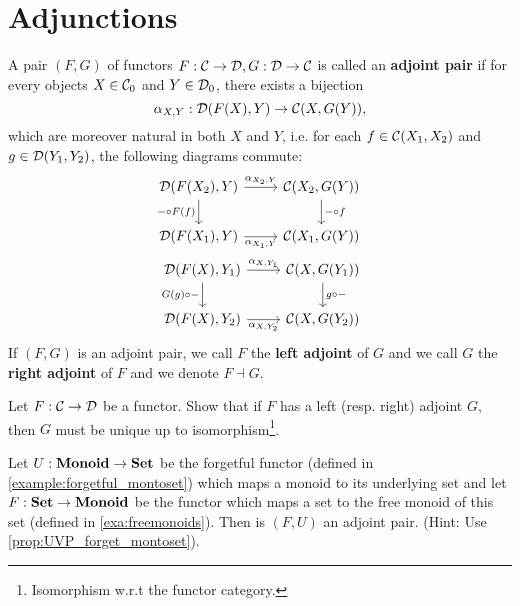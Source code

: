 \section{Adjunctions}
\label{sec:adjunctions}

\begin{dfn} A pair $(F,G)$ of functors $F : \mathcal{C}\to\mathcal{D}, G:\mathcal{D}\to\mathcal{C}$ is called an \textbf{adjoint pair} if for every objects $X\in{\mathcal{C}}_0$ and $Y\in{\mathcal{D}}_0$, there exists a bijection 
\[
\alpha_{X,Y} : {\mathcal{D}}(F(X),Y) \to {\mathcal{C}}(X,G(Y)),
\]
which are moreover natural in both $X$ and $Y$, i.e. for each $f\in{\mathcal{C}}(X_1,X_2)$ and $g\in{\mathcal{D}}(Y_1,Y_2)$, the following diagrams commute:
\begin{eqnarray}
\begin{tikzcd}
\CHom{\DD}{F(X_2)}{Y} \arrow[r, "\alpha_{X_2,Y}"] \arrow[d,swap, "\co{F(f)}{-}"] & \CHom{\CC}{X_2}{G(Y)} \arrow[d, "\co{f}{-}"] \\
\CHom{\DD}{F(X_1)}{Y} \arrow[r,swap, "\alpha_{X_1,Y}"] & \CHom{\CC}{X_1}{G(Y)}
\end{tikzcd}\\
\begin{tikzcd}
\CHom{\DD}{F(X)}{Y_1} \arrow[r, "\alpha_{X,Y_1}"] \arrow[d,swap, "\co{-}{G(g)}"] & \CHom{\CC}{X}{G(Y_1)} \arrow[d, "\co{-}{g}"] \\
\CHom{\DD}{F(X)}{Y_2} \arrow[r,swap, "\alpha_{X,Y_2}"] & \CHom{\CC}{X}{G(Y_2)}
\end{tikzcd}
\end{eqnarray}
If $(F,G)$ is an adjoint pair, we call $F$ the \textbf{left adjoint} of $G$ and we call $G$ the \textbf{right adjoint} of $F$ and we denote $F \dashv G$.
\end{dfn}

\begin{exer} Let $F:\mathcal{C}\to\mathcal{D}$ be a functor. Show that if $F$ has a left (resp. right) adjoint $G$, then $G$ must be unique up to isomorphism\footnote{Isomorphism w.r.t the functor category.}.
\end{exer}

\begin{exer} Let $U:\mathbf{Monoid}\to \mathbf{Set}$ be the forgetful functor (defined in \cref{example:forgetful_montoset}) which maps a monoid to its underlying set and let $F : \mathbf{Set}\to\mathbf{Monoid}$ be the functor which maps a set to the free monoid of this set (defined in \cref{exa:freemonoids}). Then is $(F,U)$ an adjoint pair. (Hint: Use \cref{prop:UVP_forget_montoset}). 
\end{exer}

